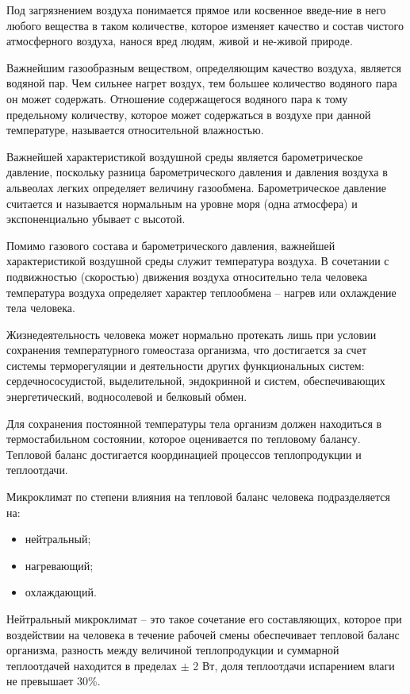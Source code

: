 Под загрязнением воздуха понимается прямое или косвенное введе-ние в него любого вещества в таком количестве, которое изменяет качество и состав чистого атмосферного воздуха, нанося вред людям, живой и не-живой природе.

Важнейшим газообразным веществом, определяющим качество воздуха, является водяной пар. Чем сильнее нагрет воздух, тем большее количество водяного пара он может содержать. Отношение содержащегося водяного пара к тому предельному количеству, которое может содержаться в воздухе при данной температуре, называется относительной влажностью.

Важнейшей характеристикой воздушной среды является барометрическое давление, поскольку разница барометрического давления и давления воздуха в альвеолах легких определяет величину газообмена. Барометрическое давление считается и называется нормальным на уровне моря (одна атмосфера) и экспоненциально убывает с высотой.

Помимо газового состава и барометрического давления, важнейшей характеристикой воздушной среды служит температура воздуха. В сочетании с подвижностью (скоростью) движения воздуха относительно тела человека температура воздуха определяет характер теплообмена – нагрев или охлаждение тела человека.

Жизнедеятельность человека может нормально протекать лишь при условии сохранения температурного гомеостаза организма, что достигается за счет системы терморегуляции и деятельности других функциональных систем: сердечнососудистой, выделительной, эндо­кринной и систем, обеспечивающих энергетический, водносолевой и белковый обмен.

Для сохранения постоянной температуры тела организм должен находиться в термостабильном состоянии, которое оценивается по тепловому балансу. Тепловой баланс достигается ко­ординацией процессов теплопродукции и теплоотдачи.

Микроклимат по степени влияния на тепловой баланс человека подразделяется на:
\begin{itemize}
	\item нейтральный;
	\item нагревающий;
	\item охлаждающий.
\end{itemize}

Нейтральный микроклимат – это такое сочетание его составляющих, которое при воздействии на человека в течение рабочей смены обеспечивает тепловой баланс организма, разность между величиной теплопродукции и суммарной теплоотдачей находится в пределах $\pm$ 2 Вт, доля теплоотдачи испарением влаги не превышает 30\%.

